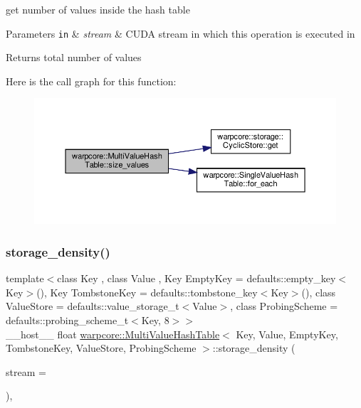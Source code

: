 get number of values inside the hash table 


\begin{DoxyParams}[1]{Parameters}
\mbox{\tt in}  & {\em stream} & C\+U\+DA stream in which this operation is executed in \\
\hline
\end{DoxyParams}
\begin{DoxyReturn}{Returns}
total number of values 
\end{DoxyReturn}
Here is the call graph for this function\+:
\nopagebreak
\begin{figure}[H]
\begin{center}
\leavevmode
\includegraphics[width=350pt]{classwarpcore_1_1MultiValueHashTable_a2f663ba48c0399e0821293c17cef1c34_cgraph}
\end{center}
\end{figure}
\mbox{\label{classwarpcore_1_1MultiValueHashTable_ab8731334f269b625d8fea853f81c05b4}} 
\subsubsection{\texorpdfstring{storage\+\_\+density()}{storage\_density()}}
{\footnotesize\ttfamily template$<$class Key , class Value , Key Empty\+Key = defaults\+::empty\+\_\+key$<$\+Key$>$(), Key Tombstone\+Key = defaults\+::tombstone\+\_\+key$<$\+Key$>$(), class Value\+Store  = defaults\+::value\+\_\+storage\+\_\+t$<$\+Value$>$, class Probing\+Scheme  = defaults\+::probing\+\_\+scheme\+\_\+t$<$\+Key, 8$>$$>$ \\
\+\_\+\+\_\+host\+\_\+\+\_\+ float \hyperlink{classwarpcore_1_1MultiValueHashTable}{warpcore\+::\+Multi\+Value\+Hash\+Table}$<$ Key, Value, Empty\+Key, Tombstone\+Key, Value\+Store, Probing\+Scheme $>$\+::storage\+\_\+density (\begin{DoxyParamCaption}\item[{cuda\+Stream\+\_\+t}]{stream = {} }\end{DoxyParamCaption})\hspace{0.3cm}{\ttfamily [inline]}, {\ttfamily [noexcept]}}



